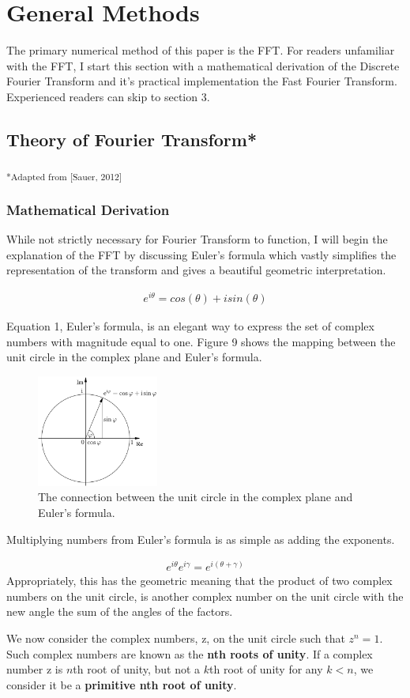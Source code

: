 \documentclass[DIV=calc, paper=a4, fontsize=11pt, twocolumn]{scrartcl}   %
\begin{document}
\section{General Methods}
The primary numerical method of this paper is the FFT. For readers unfamiliar with the FFT, I start this section with a mathematical derivation of the Discrete Fourier Transform and it's practical implementation the Fast Fourier Transform. Experienced readers can skip to section 3.
\subsection{Theory of Fourier Transform*}
\textsubscript{*Adapted from [Sauer, 2012]}
\subsubsection{Mathematical Derivation}

While not strictly necessary for Fourier Transform to function, I will begin the explanation of the FFT by discussing Euler's formula which vastly simplifies the representation of the transform and gives a beautiful geometric interpretation.

\begin{align}
e^{i\theta} = cos(\theta) + isin(\theta)
\end{align}

Equation 1, Euler's formula, is an elegant way to express the set of complex numbers with magnitude equal to one. Figure 9 shows the mapping between the unit circle in the complex plane and Euler's formula.

\begin{figure}[h]
\centering
\includegraphics[width=40mm]{figures/EulersFormula.png}
\caption{The connection between the unit circle in the complex plane and Euler's formula. }
\label{overflow}
\end{figure}


Multiplying numbers from Euler's formula is as simple as adding the exponents.

\begin{align}
e^{i\theta}e^{i\gamma} = e^{i(\theta+\gamma)}
\end{align}
Appropriately, this has the geometric meaning that the product of two complex numbers on the unit circle, is another complex number on the unit circle with the new angle the sum of the angles of the factors.
\par We now consider the complex numbers, z, on the unit circle such that $z^n = 1 $. Such complex numbers are known as the \textbf{nth roots of unity}. If a complex number z is $n$th root of unity, but not a $k$th root of unity for any $k<n$, we consider it be a \textbf{primitive nth root of unity}.
\end{document}

